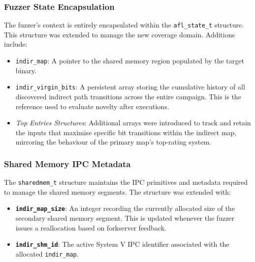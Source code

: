 \subsubsection{Fuzzer State Encapsulation}

The fuzzer's context is entirely encapsulated within the \texttt{afl\_state\_t} structure. This structure was extended to manage the new coverage domain. Additions include: 
\begin{itemize}
    \item \texttt{indir\_map}: A pointer to the shared memory region populated by the target binary.
    
    \item \texttt{indir\_virgin\_bits}: A persistent array storing the cumulative history of all discovered indirect path transitions across the entire campaign. This is the reference used to evaluate novelty after executions.
    
    \item \textit{Top Entries Structures}: Additional arrays were introduced to track and retain the inputs that maximise specific bit transitions within the indirect map, mirroring the behaviour of the primary map's top-rating system.
\end{itemize}

\subsubsection{Shared Memory IPC Metadata}

The \texttt{sharedmem\_t} structure maintains the IPC primitives and metadata required to manage the shared memory segments. The structure was extended with: 
\begin{itemize}
    \item \textbf{\texttt{indir\_map\_size}}: An integer recording the currently allocated size of the secondary shared memory segment. This is updated whenever the fuzzer issues a reallocation based on forkserver feedback.
    
    \item \textbf{\texttt{indir\_shm\_id}}: The active System V IPC identifier associated with the allocated \texttt{indir\_map}.
\end{itemize}